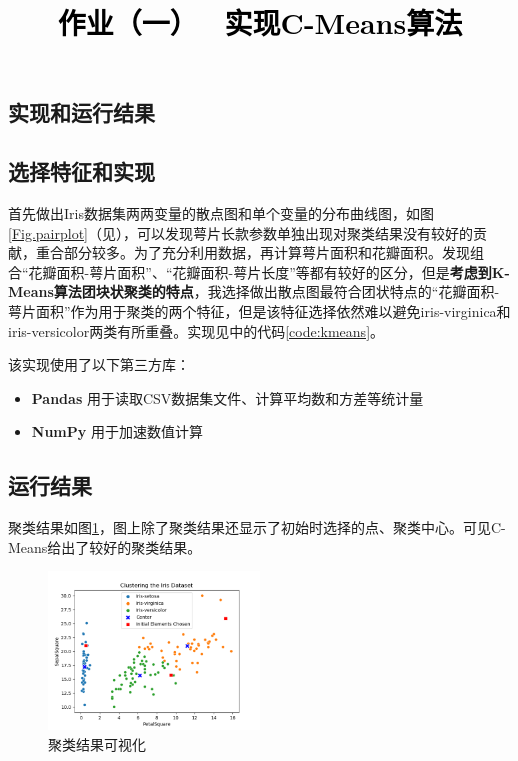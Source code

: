 \documentclass[a4paper,twoside]{article}
\newcommand{\PaperTitle}{作业（一） \ 实现C-Means算法}  %
\begin{document}
\newpage

\title{
	\Large{\textcolor{black}{\PaperTitle}}
}
	
	
\maketitle
	
\tableofcontents
 
\newpage
\begin{spacing}{1.2}
	
\section{实现和运行结果}

\subsection{选择特征和实现}

首先做出Iris数据集两两变量的散点图和单个变量的分布曲线图，如图\ref{Fig.pairplot}（见），可以发现萼片长款参数单独出现对聚类结果没有较好的贡献，重合部分较多。为了充分利用数据，再计算萼片面积和花瓣面积。发现组合“花瓣面积-萼片面积”、“花瓣面积-萼片长度”等都有较好的区分，但是\textbf{考虑到K-Means算法团块状聚类的特点}，我选择做出散点图最符合团状特点的“花瓣面积-萼片面积”作为用于聚类的两个特征，但是该特征选择依然难以避免iris-virginica和iris-versicolor两类有所重叠。实现见中的代码\ref{code:kmeans}。

该实现使用了以下第三方库：

\begin{itemize}
	\item \textbf{Pandas} 用于读取CSV数据集文件、计算平均数和方差等统计量
	\item \textbf{NumPy} 用于加速数值计算
\end{itemize}

\subsection{运行结果}

聚类结果如图\ref{Fig.result}，图上除了聚类结果还显示了初始时选择的点、聚类中心。可见C-Means给出了较好的聚类结果。

\begin{figure}[h] 
	\centering
	\includegraphics[width=0.5\textwidth]{../result.png} 
	\caption{聚类结果可视化}
	\label{Fig.result}
\end{figure}


\end{spacing}
\end{document}
